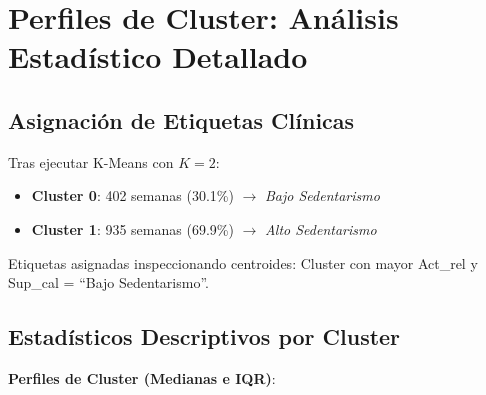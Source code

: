 \documentclass[12pt,letterpaper,twoside]{report}
\begin{document}
\section{Perfiles de Cluster: Análisis Estadístico Detallado}

\subsection{Asignación de Etiquetas Clínicas}

Tras ejecutar K-Means con $K=2$:
\begin{itemize}[noitemsep]
    \item \textbf{Cluster 0}: 402 semanas (30.1\%) $\to$ \textit{Bajo Sedentarismo}
    \item \textbf{Cluster 1}: 935 semanas (69.9\%) $\to$ \textit{Alto Sedentarismo}
\end{itemize}

Etiquetas asignadas inspeccionando centroides: Cluster con mayor Act\_rel y Sup\_cal = ``Bajo Sedentarismo''.

\subsection{Estadísticos Descriptivos por Cluster}

\begin{calculobox}
\textbf{Perfiles de Cluster (Medianas e IQR)}:

\begin{table}[H]
\centering
\caption{Perfiles de Cluster: Estadísticos Descriptivos}
\label{tab:cluster_profiles}
\end{table}
\end{calculobox}
\end{document}
